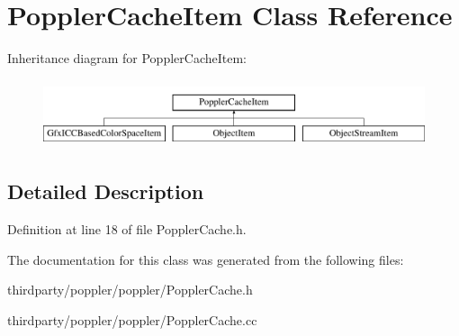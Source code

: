 \hypertarget{class_poppler_cache_item}{}\section{Poppler\+Cache\+Item Class Reference}
\label{class_poppler_cache_item}
Inheritance diagram for Poppler\+Cache\+Item\+:\begin{figure}[H]
\begin{center}
\leavevmode
\includegraphics[height=2.000000cm]{class_poppler_cache_item}
\end{center}
\end{figure}


\subsection{Detailed Description}


Definition at line 18 of file Poppler\+Cache.\+h.



The documentation for this class was generated from the following files\+:\begin{DoxyCompactItemize}
\item 
thirdparty/poppler/poppler/Poppler\+Cache.\+h\item 
thirdparty/poppler/poppler/Poppler\+Cache.\+cc\end{DoxyCompactItemize}
